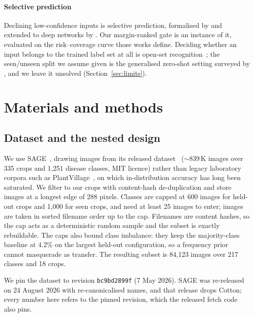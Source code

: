 \documentclass[a4paper,fleqn]{cas-dc}
\begin{document}
\paragraph{Selective prediction} Declining low-confidence inputs is selective prediction, formalised
by \citet{elyaniv2010selective} and extended to deep networks by \citet{geifman2017selective}. Our
margin-ranked gate is an instance of it, evaluated on the risk--coverage curve those works define.
Deciding whether an input belongs to the trained label set at all is open-set
recognition~\citep{scheirer2013openset}; the seen/unseen split we assume given is the generalised
zero-shot setting surveyed by \citet{xian2019gzsl}, and we leave it unsolved (Section~\ref{sec:limits}).

\section{Materials and methods}
\label{sec:methods}

\subsection{Dataset and the nested design}
\label{sec:data}

We use SAGE~\citep{arshad2026sage}, drawing images from its released dataset~\citep{sagedata2026}
($\sim$839\,K images over 335 crops and 1{,}251 disease classes, MIT licence) rather than legacy
laboratory corpora such as PlantVillage~\citep{mohanty2016}, on which in-distribution accuracy has
long been saturated. We filter to our crops with content-hash de-duplication and store images at a
longest edge of 288 pixels. Classes are capped at 600 images for held-out crops and 1{,}000 for seen
crops, and need at least 25 images to enter; images are taken in sorted filename order up to the
cap. Filenames are content hashes, so the cap acts as a deterministic random sample and the subset
is exactly rebuildable. The caps also bound class imbalance: they keep the majority-class baseline at
4.2\% on the largest held-out configuration, so a frequency prior cannot masquerade as transfer. The
resulting subset is 84{,}123 images over 217 classes and 18 crops.

We pin the dataset to revision \texttt{bc9bd2899f} (7 May 2026). SAGE was re-released on 24 August
2026 with re-canonicalised names, and that release drops Cotton; every number here refers to the
pinned revision, which the released fetch code also pins.
\end{document}
